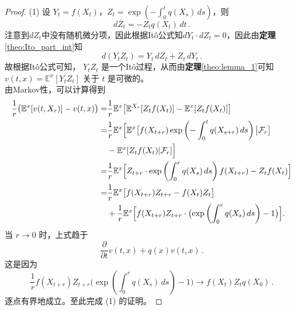 \documentclass[oneside]{sysuthesis}
\begin{document}
\begin{proof}
	\noindent(1)
	设 \( Y_t = f(X_t) \)，\( Z_t = \exp\left( -\int_0^t q(X_s)\, ds \right) \)，则
	\[
	dZ_t = -Z_t q(X_t)\, dt\,.
	\]
	注意到$dZ_t$中没有随机微分项，因此根据It\^o公式知$dY_t\cdot dZ_t=0$，因此由\textbf{定理}\ref{theo:Ito_part_int}知
	\[
	d(Y_t Z_t) = Y_t\, dZ_t + Z_t\, dY_t\,.
	\]
	故根据It\^o公式可知， \( Y_t Z_t \) 是一个It\^o过程，从而由\textbf{定理}\ref{theo:lemma_1}可知  
	\( v(t, x) = \mathbb{E}^x[Y_t Z_t] \) 关于 \( t \) 是可微的。\\
	由Markov性，可以计算得到
	\[
	\begin{aligned}
		\frac{1}{r} \bigl( \mathbb{E}^x[v(t, X_r)] - v(t, x) \bigr)
		=& \frac{1}{r} \mathbb{E}^x \bigl[ \mathbb{E}^{X_r}[Z_t f(X_t)] - \mathbb{E}^x[Z_t f(X_t)] \bigr]\\
		=& \frac{1}{r} \mathbb{E}^x \Bigl[ \mathbb{E}^x \bigl[ f(X_{t+r}) \exp\left( -\int_0^t q(X_{s+r})\, ds \right) \big|\mathcal{F}_r \bigr]\\ 
		&- \mathbb{E}^x[Z_t f(X_t)|\mathcal{F}_r] \Bigr]\\
		=& \frac{1}{r} \mathbb{E}^x \Bigl[ Z_{t+r} \cdot \exp\left( \int_0^r q(X_s)\, ds \right) f(X_{t+r}) - Z_t f(X_t) \Bigr]\\
		=&\frac{1}{r} \mathbb{E}^x \bigl[ f(X_{t+r}) Z_{t+r} - f(X_t) Z_t \bigr]\\
		&+ \frac{1}{r} \mathbb{E}^x \Bigl[ f(X_{t+r}) Z_{t+r} \cdot \bigl( \exp\left( \int_0^r q(X_s)\, ds \right) - 1 \bigr) \Bigr].\\			   
	\end{aligned}
	\]
	当 \( r \to 0 \) 时，上式趋于
	\[
	\frac{\partial}{\partial t} v(t, x) + q(x) v(t, x)\,.
	\]
	这是因为
	\[
	\frac{1}{r} f(X_{t+r}) Z_{t+r} \bigg( \exp\left( \int_0^r q(X_s)\, ds \right) - 1 \bigg) 
	\to f(X_t) Z_t q(X_0)\,.
	\]
	逐点有界地成立。至此完成 (1) 的证明。
	
	\medskip   %
	

\end{proof}
\end{document}
